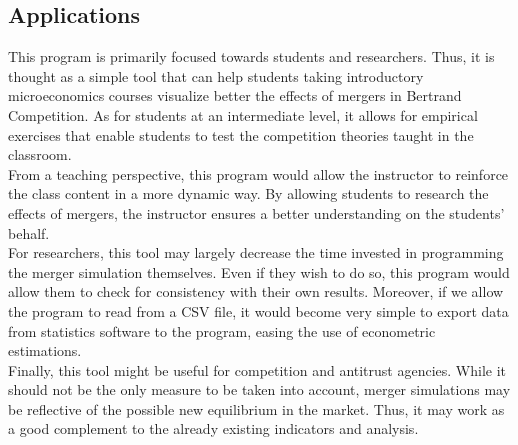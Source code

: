 \documentclass[12pt]{article}
\begin{document}
\subsection{Applications}
This program is primarily focused towards students and researchers. Thus, it is thought as a simple tool that can help students taking introductory microeconomics courses visualize better the effects of mergers in Bertrand Competition. As for students at an intermediate level, it allows for empirical exercises that enable students to test the competition theories taught in the classroom.\\
From a teaching perspective, this program would allow the instructor to reinforce the class content in a more dynamic way. By allowing students to research the effects of mergers, the instructor ensures a better understanding on the students' behalf.\\
For researchers, this tool may largely decrease the time invested in programming the merger simulation themselves. Even if they wish to do so, this program would allow them to check for consistency with their own results. Moreover, if we allow the program to read from a CSV file, it would become very simple to export data from statistics software to the program, easing the use of econometric estimations.\\
Finally, this tool might be useful for competition and antitrust agencies. While it should not be the only measure to be taken into account, merger simulations may be reflective of the possible new equilibrium in the market. Thus, it may work as a good complement to the already existing indicators and analysis.
\end{document}

